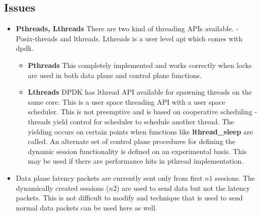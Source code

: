 \subsection{Issues}
\begin{itemize}
	\item \textbf{Pthreads, Lthreads}
	There are two kind of threading APIs available. - Posix-threads and lthreads. Lthreads is a user level api which comes with dpdk.
	\begin{itemize}
		\item \textbf{Pthreads} This completely implemented and works correctly when locks are used in both data plane and control plane functions. 
		\item \textbf{Lthreads} DPDK has lthread API available for spawning threads on the 
		same core. This is a user space threading API with a user space scheduler. This is not preemptive and is based on cooperative scheduling -threads yield control for 
		scheduler to schedule another thread. The yielding occurs on certain points when functions like \textbf{lthread\_sleep} are called. An alternate set of control plane procedures for defining the dynamic session functionality is defined on an experimental basis. This may be used if there are performance hits in pthread implementation.
	\end{itemize}
	\item Data plane latency packets are currently sent only from first $n1$ sessions. The dynamically created sessions ($n2$) are used to send data but not the latency packets. This is not difficult to modify and technique that is used to send normal data packets can be used here as well. 

\end{itemize}
